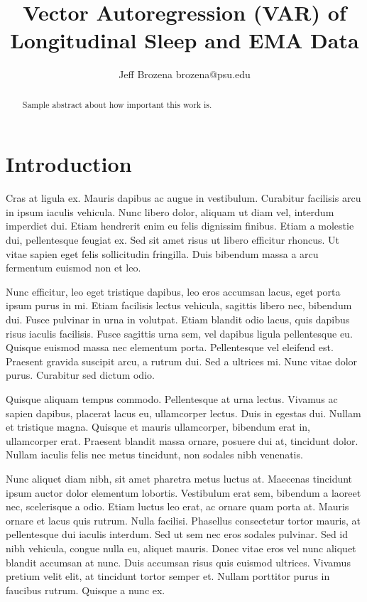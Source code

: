 \documentclass{article}
\begin{document}
\title{Vector Autoregression (VAR) of Longitudinal Sleep and EMA Data}

\author{\name Jeff Brozena \email brozena@psu.edu}
\maketitle

\begin{abstract}%
  Sample abstract about how important this work is.
\end{abstract}

\hypertarget{introduction}{%
\section{Introduction}\label{introduction}}

Cras at ligula ex. Mauris dapibus ac augue in vestibulum. Curabitur
facilisis arcu in ipsum iaculis vehicula. Nunc libero dolor, aliquam ut
diam vel, interdum imperdiet dui. Etiam hendrerit enim eu felis
dignissim finibus. Etiam a molestie dui, pellentesque feugiat ex. Sed
sit amet risus ut libero efficitur rhoncus. Ut vitae sapien eget felis
sollicitudin fringilla. Duis bibendum massa a arcu fermentum euismod non
et leo.

Nunc efficitur, leo eget tristique dapibus, leo eros accumsan lacus,
eget porta ipsum purus in mi. Etiam facilisis lectus vehicula, sagittis
libero nec, bibendum dui. Fusce pulvinar in urna in volutpat. Etiam
blandit odio lacus, quis dapibus risus iaculis facilisis. Fusce sagittis
urna sem, vel dapibus ligula pellentesque eu. Quisque euismod massa nec
elementum porta. Pellentesque vel eleifend est. Praesent gravida
suscipit arcu, a rutrum dui. Sed a ultrices mi. Nunc vitae dolor purus.
Curabitur sed dictum odio.

Quisque aliquam tempus commodo. Pellentesque at urna lectus. Vivamus ac
sapien dapibus, placerat lacus eu, ullamcorper lectus. Duis in egestas
dui. Nullam et tristique magna. Quisque et mauris ullamcorper, bibendum
erat in, ullamcorper erat. Praesent blandit massa ornare, posuere dui
at, tincidunt dolor. Nullam iaculis felis nec metus tincidunt, non
sodales nibh venenatis.

Nunc aliquet diam nibh, sit amet pharetra metus luctus at. Maecenas
tincidunt ipsum auctor dolor elementum lobortis. Vestibulum erat sem,
bibendum a laoreet nec, scelerisque a odio. Etiam luctus leo erat, ac
ornare quam porta at. Mauris ornare et lacus quis rutrum. Nulla
facilisi. Phasellus consectetur tortor mauris, at pellentesque dui
iaculis interdum. Sed ut sem nec eros sodales pulvinar. Sed id nibh
vehicula, congue nulla eu, aliquet mauris. Donec vitae eros vel nunc
aliquet blandit accumsan at nunc. Duis accumsan risus quis euismod
ultrices. Vivamus pretium velit elit, at tincidunt tortor semper et.
Nullam porttitor purus in faucibus rutrum. Quisque a nunc ex.
\end{document}
